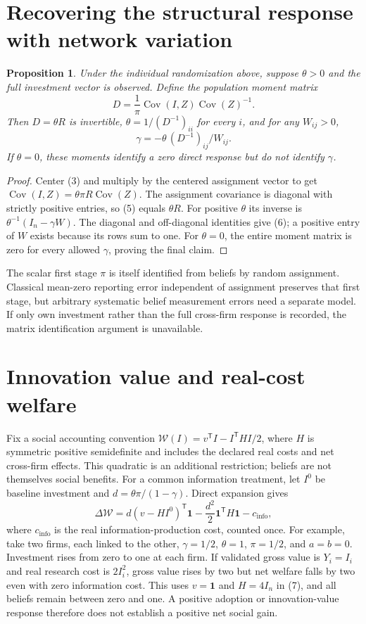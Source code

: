 \documentclass[11pt]{article}
\newtheorem{proposition}[theorem]{Proposition}
\theoremstyle{definition}
\begin{document}
\section*{Recovering the structural response with network variation}
\begin{proposition}
Under the individual randomization above, suppose $\theta>0$ and the
full investment vector is observed. Define the population moment matrix
\[
 D=\frac1\pi\operatorname{Cov}(I,Z)
                 \operatorname{Cov}(Z)^{-1}.             \tag{5}
\]
Then $D=\theta R$ is invertible,
$\theta=1/(D^{-1})_{ii}$ for every $i$, and for any $W_{ij}>0$,
\[
 \gamma=-\theta\,(D^{-1})_{ij}/W_{ij}.                  \tag{6}
\]
If $\theta=0$, these moments identify a zero direct response but do
not identify $\gamma$.
\end{proposition}
\begin{proof}
Center (3) and multiply by the centered assignment vector to get
$\operatorname{Cov}(I,Z)=\theta\pi R\operatorname{Cov}(Z)$.
The assignment covariance is diagonal with strictly positive entries,
so (5) equals $\theta R$. For positive $\theta$ its inverse is
$\theta^{-1}(I_n-\gamma W)$. The diagonal and off-diagonal identities
give (6); a positive entry of $W$ exists because its rows sum to one.
For $\theta=0$, the entire moment matrix is zero for every allowed
$\gamma$, proving the final claim.
\end{proof}
The scalar first stage $\pi$ is itself identified from beliefs by
random assignment. Classical mean-zero reporting error independent of
assignment preserves that first stage, but arbitrary systematic belief
measurement errors need a separate model. If only own investment rather
than the full cross-firm response is recorded, the matrix identification
argument is unavailable.

\section*{Innovation value and real-cost welfare}
Fix a social accounting convention
$\mathcal W(I)=v^{\mathsf T}I-I^{\mathsf T}HI/2$, where
$H$ is symmetric positive semidefinite and includes the declared real
costs and net cross-firm effects. This quadratic is an additional
restriction; beliefs are not themselves social benefits. For a common
information treatment, let $I^0$ be baseline investment and
$d=\theta\pi/(1-\gamma)$. Direct expansion gives
\[
 \Delta\mathcal W
 =d(v-HI^0)^{\mathsf T}\mathbf1
 -\frac{d^2}{2}\mathbf1^{\mathsf T}H\mathbf1-c_{\mathrm{info}}, \tag{7}
\]
where $c_{\mathrm{info}}$ is the real information-production cost,
counted once. For example, take two firms, each linked to the other,
$\gamma=1/2$, $\theta=1$, $\pi=1/2$, and $a=b=0$.
Investment rises from zero to one at each firm. If validated gross value
is $Y_i=I_i$ and real research cost is $2I_i^2$, gross value rises by
two but net welfare falls by two even with zero information cost.
This uses $v=\mathbf1$ and $H=4I_n$ in (7), and all beliefs remain
between zero and one. A positive adoption or innovation-value response
therefore does not establish a positive net social gain.
\end{document}
